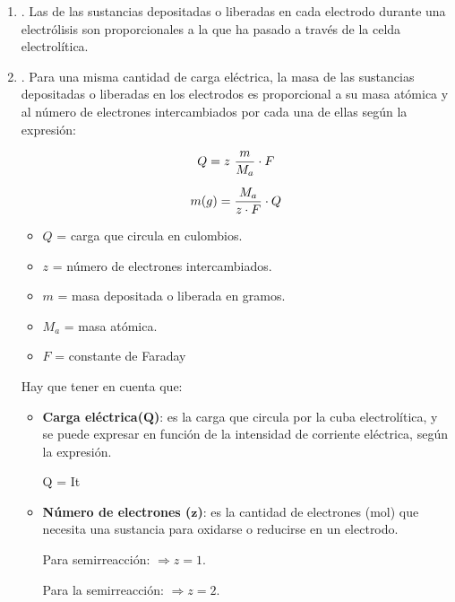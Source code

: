
\begin{enumerate}[label=\numberballmDarkTeal]
        \item {}.
        Las  de las sustancias depositadas o liberadas en cada electrodo durante una electrólisis son proporcionales a la  que ha pasado a través de la celda electrolítica.
        \item {}.
        Para una misma cantidad de carga eléctrica, la masa de las sustancias depositadas o liberadas en los electrodos es proporcional a su masa atómica y al número de electrones intercambiados por cada una de ellas según la expresión:

        \begin{gather}
            Q = z\ \dfrac{m}{M_a}\cdot F  \notag \separ
            m(g) = \dfrac{M_a}{z\cdot F}\cdot Q
        \end{gather}

        \begin{itemize}
            \item \(Q\) = carga que circula en culombios.
            \item \(z\) = número de electrones intercambiados.
            \item \(m\) = masa depositada o liberada en gramos.
            \item \(M_a\) = masa atómica.
            \item \(F\) = constante de Faraday
        \end{itemize}

        Hay que tener en cuenta que:

        \begin{itemize}
            \item \textbf{Carga eléctrica(\(\bm{Q}\))}: es la carga que circula por la cuba electrolítica, y se puede expresar en función de la intensidad de corriente eléctrica, según la expresión.
            \begin{centeredequation}
                Q = I\cdot t
            \end{centeredequation}
            \item \textbf{Número de electrones (\(\bm{z}\))}: es la cantidad de electrones (mol) que necesita una sustancia para oxidarse o reducirse en un electrodo.

            Para semirreacción:  \(\Rightarrow z = 1\).

            Para la semirreacción:  \(\Rightarrow z = 2\).
        \end{itemize}

\end{enumerate}


